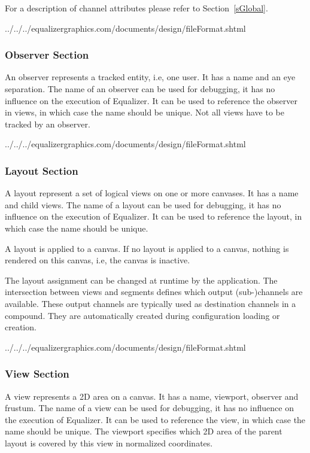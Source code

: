 \documentclass[10pt,a4]{scrartcl}
\newcommand{\sref}[1]{Section~\ref{#1}}
\begin{document}
For a description of channel attributes please refer to \sref{sGlobal}.

{\footnotesize
  {../../../equalizergraphics.com/documents/design/fileFormat.shtml}}

\subsubsection{Observer Section}

An observer represents a tracked entity, i.e, one user. It has a name
and an eye separation. The name of an observer can be used for
debugging, it has no influence on the execution of Equalizer. It can be
used to reference the observer in views, in which case the name should
be unique. Not all views have to be tracked by an observer.

{\footnotesize
  {../../../equalizergraphics.com/documents/design/fileFormat.shtml}}

\subsubsection{Layout Section}

A layout represent a set of logical views on one or more canvases. It
has a name and child views. The name of a layout can be used for
debugging, it has no influence on the execution of Equalizer. It can be
used to reference the layout, in which case the name should be unique.

A layout is applied to a canvas. If no layout is applied to a canvas,
nothing is rendered on this canvas, i.e, the canvas is inactive.

The layout assignment can be changed at runtime by the application. The
intersection between views and segments defines which output
(sub-)channels are available. These output channels are typically used
as destination channels in a compound. They are automatically created
during configuration loading or creation.

{\footnotesize
  {../../../equalizergraphics.com/documents/design/fileFormat.shtml}}

\subsubsection{View Section}

A view represents a 2D area on a canvas. It has a name, viewport,
observer and frustum. The name of a view can be used for debugging, it
has no influence on the execution of Equalizer. It can be used to
reference the view, in which case the name should be unique. The viewport
specifies which 2D area of the parent layout is covered by this view in
normalized coordinates.
\end{document}
